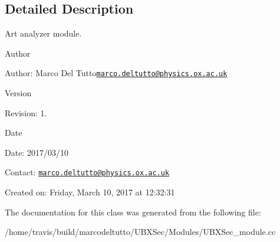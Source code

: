 \subsection{Detailed Description}
Art analyzer module. 

\begin{DoxyAuthor}{Author}

\end{DoxyAuthor}
\begin{DoxyParagraph}{Author\-:}
Marco Del Tutto\href{mailto:marco.deltutto@physics.ox.ac.uk}{\tt marco.\-deltutto@physics.\-ox.\-ac.\-uk} 
\end{DoxyParagraph}


\begin{DoxyVersion}{Version}

\end{DoxyVersion}
\begin{DoxyParagraph}{Revision\-:}
1. 
\end{DoxyParagraph}


\begin{DoxyDate}{Date}

\end{DoxyDate}
\begin{DoxyParagraph}{Date\-:}
2017/03/10 
\end{DoxyParagraph}


Contact\-: \href{mailto:marco.deltutto@physics.ox.ac.uk}{\tt marco.\-deltutto@physics.\-ox.\-ac.\-uk}

Created on\-: Friday, March 10, 2017 at 12\-:32\-:31 

The documentation for this class was generated from the following file\-:\begin{DoxyCompactItemize}
\item 
/home/travis/build/marcodeltutto/\-U\-B\-X\-Sec/\-Modules/U\-B\-X\-Sec\-\_\-module.\-cc\end{DoxyCompactItemize}
